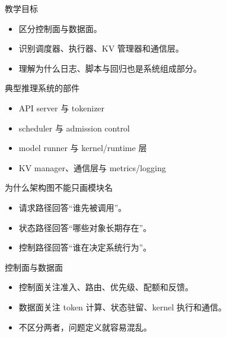 




\begin{frame}[plain]
  \titlepage
\end{frame}

\begin{frame}{教学目标}
  \begin{itemize}
    \item 区分控制面与数据面。
    \item 识别调度器、执行器、KV 管理器和通信层。
    \item 理解为什么日志、脚本与回归也是系统组成部分。
  \end{itemize}
\end{frame}

\begin{frame}{典型推理系统的部件}
  \begin{itemize}
    \item API server 与 tokenizer
    \item scheduler 与 admission control
    \item model runner 与 kernel/runtime 层
    \item KV manager、通信层与 metrics/logging
  \end{itemize}
\end{frame}

\begin{frame}{为什么架构图不能只画模块名}
  \begin{itemize}
    \item 请求路径回答“谁先被调用”。
    \item 状态路径回答“哪些对象长期存在”。
    \item 控制路径回答“谁在决定系统行为”。
  \end{itemize}
\end{frame}

\begin{frame}{控制面与数据面}
  \begin{itemize}
    \item 控制面关注准入、路由、优先级、配额和反馈。
    \item 数据面关注 token 计算、状态驻留、kernel 执行和通信。
    \item 不区分两者，问题定义就容易混乱。
  \end{itemize}
\end{frame}

